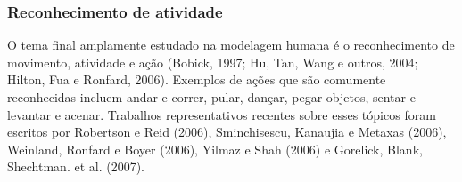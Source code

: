 \documentclass{article}
\begin{document}
\subsubsection{Reconhecimento de atividade}
O tema final amplamente estudado na modelagem humana é o reconhecimento de movimento, atividade e ação (Bobick, 1997; Hu, Tan, Wang e outros, 2004; Hilton, Fua e Ronfard, 2006). Exemplos de ações que são comumente reconhecidas incluem andar e correr, pular, dançar, pegar objetos, sentar e levantar e acenar. Trabalhos representativos recentes sobre esses tópicos foram escritos por Robertson e Reid (2006), Sminchisescu, Kanaujia e Metaxas (2006), Weinland, Ronfard e Boyer (2006), Yilmaz e Shah (2006) e Gorelick, Blank, Shechtman. et al. (2007).


\clearpage
\small


\end{document}
